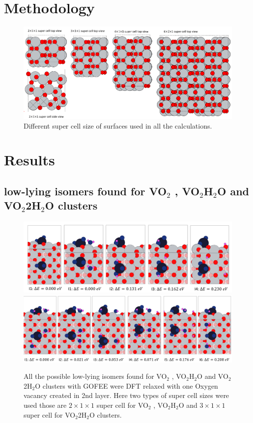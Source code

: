 \documentclass[aip,amsmath,amssymb,reprint, jcp]{revtex4-1}
\begin{document}
\section{Methodology}
\begin{figure}
\centering
\includegraphics[width=1.0\textwidth]{Anatase_TiO2_101surface_used.png}
\caption{Different super cell size of surfaces used in all the calculations.}
\label{fig:exptobser}
\end{figure}
\section{Results}
\subsection{low-lying isomers found for VO$_2$ , VO$_2$H$_2$O and VO$_2$2H$_2$O clusters}
\begin{figure}
\centering
\includegraphics[width=1.0\textwidth]{VO2_VO2H2Oclusters_TiO2_101sur_2by1supercell.png}
\includegraphics[width=1.0\textwidth]{VO2_2H2Oclusters_TiO2_101sur_3by1supercell.png}
\caption{All the possible low-lying isomers found for VO$_2$ , VO$_2$H$_2$O and VO$_2$2H$_2$O clusters with GOFEE were DFT relaxed with one Oxygen vacancy created in 2nd layer. Here two types of super cell sizes were used those are $2 \times 1 \times 1$ super cell for VO$_2$ , VO$_2$H$_2$O and  $3 \times 1 \times 1$ super cell for VO$_2$2H$_2$O clusters.}
\label{fig:exptobser}
\end{figure}
\end{document}
